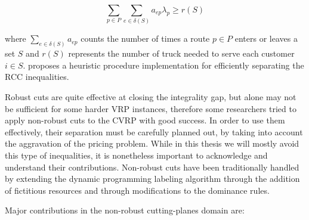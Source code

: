 \begin{equation}
	\sum_{p \in P} \sum_{e \in \delta(S)}  a_{ep} \lambda_p \ge r(S)
\end{equation}

where $\sum_{e \in \delta(S)} a_{ep}$ counts the number of times a route $p \in P$
enters or leaves a set $S$ and $r(S)$ represents the number of truck needed
to serve each customer $i \in S$.
\textcite{lysgaard2003cvrpsep} proposes a heuristic procedure implementation
for efficiently separating the RCC inequalities.

\medskip

Robust cuts are quite effective at closing the integrality gap, but alone may not
be sufficient for some harder VRP instances,
therefore some researchers tried to apply non-robust cuts to the CVRP with good success.
In order to use them effectively, their separation must be carefully
planned out, by taking into account the aggravation of the pricing problem.
While in this thesis we will mostly avoid this type of inequalities,
it is nonetheless important to acknowledge and understand their contributions.
Non-robust cuts have been traditionally handled by extending the
dynamic programming labeling algorithm
through the addition of fictitious resources and through modifications to the dominance rules.

\medskip

Major contributions in the non-robust cutting-planes domain are:

